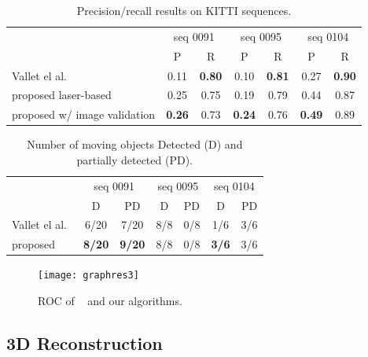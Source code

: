 \begin{table}[t]
\caption{Precision/recall results on KITTI sequences.}
\label{tab:resPR}
\centering
\setlength{\tabcolsep}{3px}
\begin{tabular}{lcccccc}
\toprule                                                                                
&\multicolumn{2}{c}{seq 0091}&\multicolumn{2}{c}{seq 0095}&\multicolumn{2}{c}{seq 0104}\\
&P & R &P & R &P & R \\
\midrule
Vallet el al.~\cite{vallet2015extracting}       &       0.11&\textbf{0.80}      &       0.10&\textbf{0.81}      & 0.27&\textbf{0.90}\\
proposed laser-based                            &   0.25&0.75   &  0.19&0.79    & 0.44&0.87\\
proposed w/ image validation                            &       \textbf{0.26}&0.73      &  \textbf{0.24}&0.76   & \textbf{0.49}&0.89\\
\end{tabular}
\end{table}


\begin{table}[t]
\caption{Number of  moving objects Detected (D) and partially detected (PD).}
\label{tab:numPRobj}
\centering
\begin{tabular}{lcccccc}
\toprule 
&\multicolumn{2}{c}{seq 0091}&\multicolumn{2}{c}{seq 0095}&\multicolumn{2}{c}{seq 0104}\\
&D & PD &D & PD &D & PD \\
\midrule
Vallet el al.~\cite{vallet2015extracting}       & 6/20  & 7/20  & 8/8 &   0/8   &    1/6        & 3/6\\
proposed & \textbf{8/20}        & \textbf{9/20} & 8/8 &   0/8   &    \textbf{3/6}       & 3/6 \\
\end{tabular}
\end{table}

\begin{figure}[t]
\centering
\texttt{[image: graphres3]}
\caption{ROC of ~\cite{vallet2015extracting} and our algorithms.}
\label{fig:roc}
\end{figure}

\subsection{3D Reconstruction}




